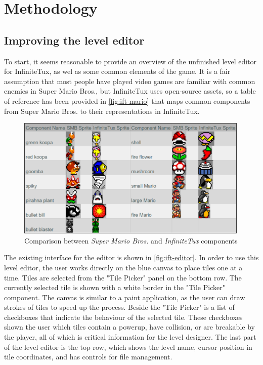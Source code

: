 \chapter{Methodology}

\section{Improving the level editor}

To start, it seems reasonable to provide an overview of the unfinished level editor for
InfiniteTux, as wel as some common elements of the game. It is a fair assumption that most
people have played video games are familiar with common enemies in Super Mario Bros., but
InfiniteTux uses open-source assets, so a table of reference has been provided in \autoref{fig:ift-mario}
that maps common components from Super Mario Bros. to their representations in InfiniteTux.

\begin{figure}[ht]
    \centering
    \includegraphics[width=0.8\linewidth]{img/fig10-ift-mario.png}
    \caption{Comparison between \emph{Super Mario Bros.} and \emph{InfiniteTux} components}
    \label{fig:ift-mario}
\end{figure}

The existing interface for the editor is shown in \autoref{fig:ift-editor}. In order to use
this level editor, the user works directly on the blue canvas to place tiles one at a time.
Tiles are selected from the "Tile Picker" panel on the bottom row. The currently selected
tile is shown with a white border in the "Tile Picker" component. The canvas is similar to
a paint application, as the user can draw strokes of tiles to speed up the process. Beside
the "Tile Picker" is a list of checkboxes that indicate the behaviour of the selected tile.
These checkboxes shown the user which tiles contain a powerup, have collision, or are
breakable by the player, all of which is critical information for the level designer. The
last part of the level editor is the top row, which shows the level name, cursor position
in tile coordinates, and has controls for file management.

